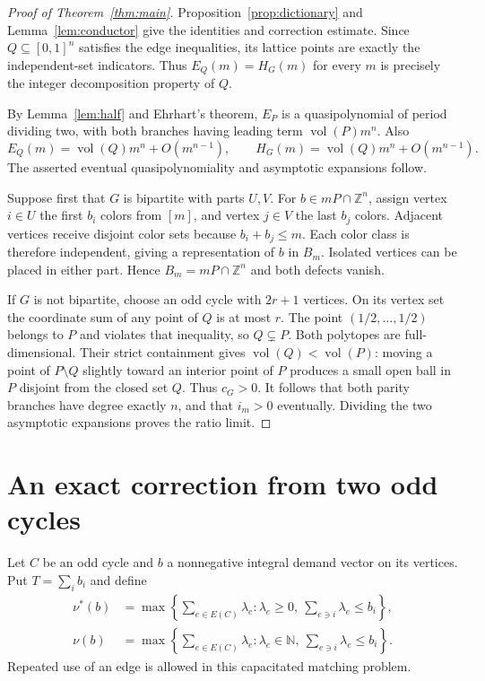 \documentclass[11pt]{article}
\theoremstyle{remark}
\newcommand{\NN}{\mathbb N}
\newcommand{\ZZ}{\mathbb Z}
\newcommand{\vol}{\operatorname{vol}}
\begin{document}
\begin{proof}[Proof of Theorem~\ref{thm:main}]
Proposition~\ref{prop:dictionary} and Lemma~\ref{lem:conductor} give the
identities and correction estimate. Since $Q\subseteq[0,1]^n$ satisfies
the edge inequalities, its lattice points are exactly the independent-set
indicators. Thus $E_Q(m)=H_G(m)$ for every $m$ is precisely the integer
decomposition property of $Q$.

By Lemma~\ref{lem:half} and Ehrhart's theorem, $E_P$ is a
quasipolynomial of period dividing two, with both branches having leading
term $\vol(P)m^n$. Also
\[
E_Q(m)=\vol(Q)m^n+O(m^{n-1}),\qquad
H_G(m)=\vol(Q)m^n+O(m^{n-1}).
\]
The asserted eventual quasipolynomiality and asymptotic expansions follow.

Suppose first that $G$ is bipartite with parts $U,V$. For
$b\in mP\cap\ZZ^n$, assign vertex $i\in U$ the first $b_i$ colors from
$[m]$, and vertex $j\in V$ the last $b_j$ colors. Adjacent vertices
receive disjoint color sets because $b_i+b_j\leq m$. Each color class is
therefore independent, giving a representation of $b$ in $B_m$.
Isolated vertices can be placed in either part. Hence $B_m=mP\cap\ZZ^n$
and both defects vanish.

If $G$ is not bipartite, choose an odd cycle with $2r+1$ vertices. On its
vertex set the coordinate sum of any point of $Q$ is at most $r$. The
point $(1/2,\ldots,1/2)$ belongs to $P$ and violates that inequality, so
$Q\subsetneq P$. Both polytopes are full-dimensional. Their strict
containment gives $\vol(Q)<\vol(P)$: moving a point of $P\setminus Q$
slightly toward an interior point of $P$ produces a small open ball in
$P$ disjoint from the closed set $Q$. Thus $c_G>0$. It follows that both
parity branches have degree exactly $n$, and that $i_m>0$ eventually.
Dividing the two asymptotic expansions proves the ratio limit.
\end{proof}

\section{An exact correction from two odd cycles}

Let $C$ be an odd cycle and $b$ a nonnegative integral demand vector on
its vertices. Put $T=\sum_i b_i$ and define
\begin{align*}
\nu^*(b)&=\max\left\{\sum_{e\in E(C)}\lambda_e:
\lambda_e\geq0,\ \sum_{e\ni i}\lambda_e\leq b_i\right\},\\
\nu(b)&=\max\left\{\sum_{e\in E(C)}\lambda_e:
\lambda_e\in\NN,\ \sum_{e\ni i}\lambda_e\leq b_i\right\}.
\end{align*}
Repeated use of an edge is allowed in this capacitated matching problem.
\end{document}
